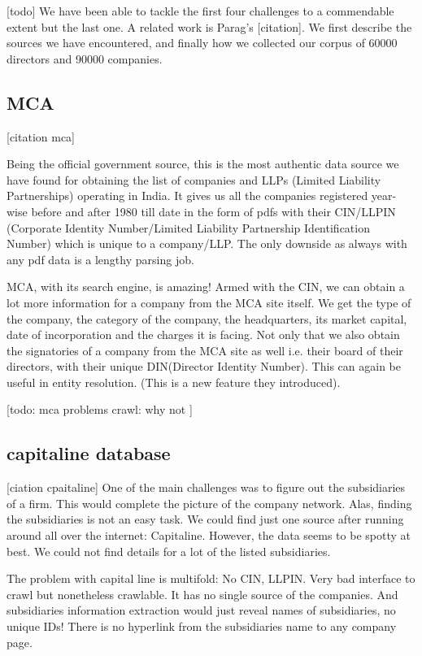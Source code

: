 [todo]
We have been able to tackle the first four challenges to a commendable extent but the last one. A related work is Parag's [citation]. We first describe the sources we have encountered, and finally how we collected our corpus of 60000 directors and 90000 companies.

\subsection{MCA}
[citation mca]

Being the official government source, this is the most authentic data source we have found for obtaining the list of companies and LLPs (Limited Liability Partnerships) operating in India. It gives us all the companies registered year-wise before and after 1980 till date in the form of pdfs with their CIN/LLPIN (Corporate Identity Number/Limited Liability Partnership Identification Number) which is unique to a company/LLP. The only downside as always with any pdf data is a lengthy parsing job.

MCA, with its search engine, is amazing! Armed with the CIN, we can obtain a lot more information for a company from the MCA site itself. We get the type of the company, the category of the company, the headquarters, its market capital, date of incorporation and the charges it is facing. Not only that we also obtain the signatories of a company from the MCA site as well i.e. their board of their directors, with their unique DIN(Director Identity Number). This can again be useful in entity resolution. (This is a new feature they introduced).

[todo: mca problems
crawl: why not
]


\subsection{capitaline database}
[ciation cpaitaline]
One of the main challenges was to figure out the subsidiaries of a firm. This would complete the picture of the company network. Alas, finding the subsidiaries is not an easy task. We could find just one source after running around all over the internet:  Capitaline. However, the data seems to be spotty at best. We could not find details for a lot of the listed subsidiaries.

The problem with capital line is multifold: No CIN, LLPIN. Very bad interface to crawl but nonetheless crawlable. It has no single source of the companies. And subsidiaries information extraction would just reveal names of subsidiaries, no unique IDs! There is no hyperlink from the subsidiaries name to any company page.

